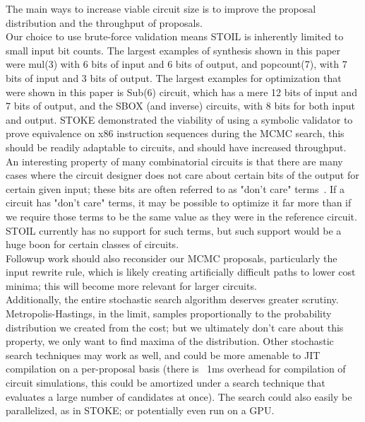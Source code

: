 \documentclass{article}
\begin{document}
\begin{table}
The main ways to increase viable circuit size is to improve the proposal distribution and the throughput of proposals.\\
 
Our choice to use brute-force validation means STOIL is inherently limited to small input bit counts. The largest examples of synthesis shown in this paper were mul(3) with 6 bits of input and 6 bits of output, and popcount(7), with 7 bits of input and 3 bits of output. The largest examples for optimization that were shown in this paper is Sub(6) circuit, which has a mere 12 bits of input and 7 bits of output, and the SBOX (and inverse) circuits, with 8 bits for both input and output. STOKE demonstrated the viability of using a symbolic validator to prove equivalence on x86 instruction sequences during the MCMC search, this should be readily adaptable to circuits, and should have increased throughput. \\

An interesting property of many combinatorial circuits is that there are many cases where the circuit designer does not care about certain bits of the output for certain given input; these bits are often referred to as "don't care" terms~\cite{strong2013basic}. If a circuit has "don't care" terms, it may be possible to optimize it far more than if we require those terms to be the same value as they were in the reference circuit. STOIL currently has no support for such terms, but such support would be a huge boon for certain classes of circuits.\\

Followup work should also reconsider our MCMC proposals, particularly the input rewrite rule, which is likely creating artificially difficult paths to lower cost minima; this will become more relevant for larger circuits.\\

Additionally, the entire stochastic search algorithm deserves greater scrutiny. Metropolis-Hastings, in the limit, samples proportionally to the probability distribution we created from the cost; but we ultimately don't care about this property, we only want to find maxima of the distribution. Other stochastic search techniques may work as well, and could be more amenable to JIT compilation on a per-proposal basis (there is ~1ms overhead for compilation of circuit simulations, this could be amortized under a search technique that evaluates a large number of candidates at once). The search could also easily be parallelized, as in STOKE; or potentially even run on a GPU.\\


\end{table}
\end{document}
